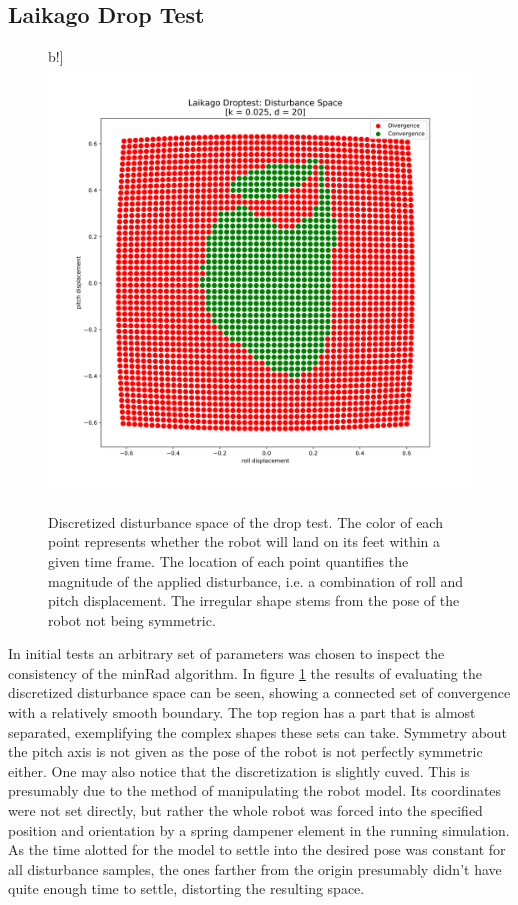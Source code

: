     

    \subsection{Laikago Drop Test}
    \begin{figure}b!]
    \centering
    \includegraphics[width=.6\linewidth]{figures/droptest_ds_v2.png}
    \caption[Discretized Disturbande Space, Drop Test]{Discretized disturbance space of the drop test. The color of each point represents whether the robot will land on its feet within a given time frame. The location of each point quantifies the magnitude of the applied disturbance, i.e. a combination of roll and pitch displacement. The irregular shape stems from the pose of the robot not being symmetric.}
    \label{fig:drop}
    \end{figure}    
    In initial tests an arbitrary set of parameters was chosen to inspect the consistency of the minRad algorithm. In figure \ref{fig:drop} the results of evaluating the discretized disturbance space can be seen, showing a connected set of convergence with a relatively smooth boundary. The top region has a part that is almost separated, exemplifying the complex shapes these sets can take. Symmetry about the pitch axis is not given as the pose of the robot is not perfectly symmetric either. One may also notice that the discretization is slightly cuved. This is presumably due to the method of manipulating the robot model. Its coordinates were not set directly, but rather the whole robot was forced into the specified position and orientation by a spring dampener element in the running simulation. As the time alotted for the model to settle into the desired pose was constant for all disturbance samples, the ones farther from the origin presumably didn't have quite enough time to settle, distorting the resulting space.
    
